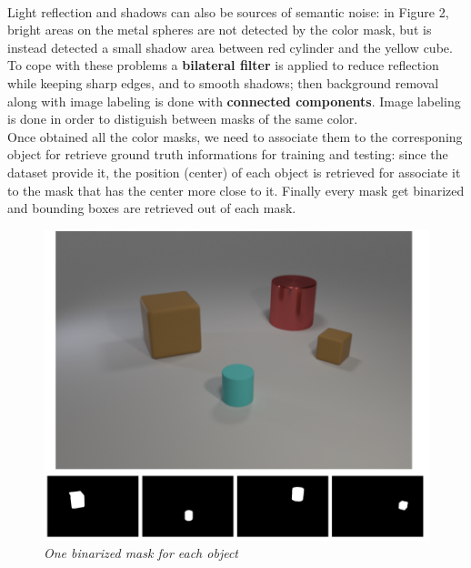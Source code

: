 \documentclass[10pt,twocolumn,letterpaper]{article}
\begin{document}
  \\Light reflection and shadows can also be sources of semantic noise: in Figure 2,
  bright areas on the metal spheres are not detected by the color mask,
  but is instead detected a small shadow area between red cylinder and the yellow cube.
  \\To cope with these problems a \textbf{bilateral filter} is applied to reduce reflection 
  while keeping sharp edges, and to smooth shadows;
  then background removal along with image labeling is done with \textbf{connected components}.
  Image labeling is done in order to distiguish between masks of the same color.
  \\Once obtained all the color masks, we need to associate them to the corresponing object
  for retrieve ground truth informations for training and testing:
   since the dataset provide it, the position (center) of each object is retrieved for
  associate it to the mask that has the center more close to it.
  Finally every mask get binarized and bounding boxes are retrieved out of each mask. 
  \begin{figure}[h] %
    \centering
    \includegraphics[scale=0.63]{images/preprocessing.png}
    \caption{\textit{One binarized mask for each object}}
  \end{figure}
\end{document}
